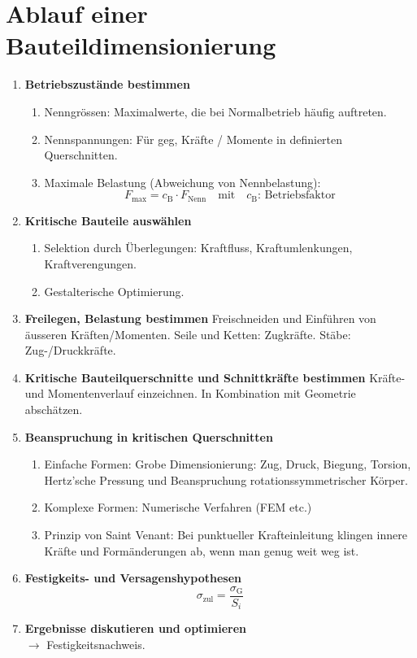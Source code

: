 \section{Ablauf einer Bauteildimensionierung} %
	\begin{enumerate}
		\item \textbf{Betriebszustände bestimmen}
			\begin{enumerate}
				\item Nenngrössen: Maximalwerte, die bei Normalbetrieb häufig auftreten.
				\item Nennspannungen: Für geg, Kräfte / Momente in definierten Querschnitten.
				\item Maximale Belastung (Abweichung von Nennbelastung):
				\begin{equation*}
					F_{\text{max}}=c_{\text{B}} \cdot F_{\text{Nenn}} \quad \text{mit} \quad c_{\text{B}} \text{: Betriebsfaktor}
				\end{equation*}
			\end{enumerate}
		\item \textbf{Kritische Bauteile auswählen}
			\begin{enumerate}
				\item Selektion durch Überlegungen: Kraftfluss, Kraftumlenkungen, Kraftverengungen.
				\item Gestalterische Optimierung.
			\end{enumerate}
		\item \textbf{Freilegen, Belastung bestimmen}
			Freischneiden und Einführen von äusseren Kräften/Momenten. Seile und Ketten: Zugkräfte. Stäbe: Zug-/Druckkräfte.
		\item \textbf{Kritische Bauteilquerschnitte und Schnittkräfte bestimmen}
			Kräfte- und Momentenverlauf einzeichnen. In Kombination mit Geometrie abschätzen.
		\item \textbf{Beanspruchung in kritischen Querschnitten}
			\begin{enumerate}
				\item Einfache Formen: Grobe Dimensionierung: Zug, Druck, Biegung, Torsion, Hertz'sche Pressung und Beanspruchung rotationssymmetrischer Körper.
				\item Komplexe Formen: Numerische Verfahren (FEM etc.)
				\item Prinzip von Saint Venant: Bei punktueller Krafteinleitung klingen innere Kräfte und Formänderungen ab, wenn man genug weit weg ist.
			\end{enumerate}
		\item \textbf{Festigkeits- und Versagenshypothesen}
			\begin{equation*}
				\sigma_{\text{zul}}=\frac{\sigma_{\text{G}}}{S_i}
			\end{equation*}
		\item \textbf{Ergebnisse diskutieren und optimieren}\\
			$\rightarrow$ Festigkeitsnachweis.
	\end{enumerate}

